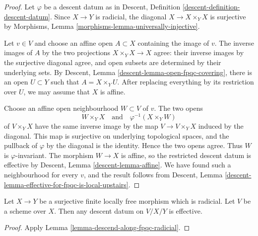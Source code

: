 \begin{proof}
Let $\varphi$ be a descent datum as in
Descent, Definition \ref{descent-definition-descent-datum}.
Since $X \to Y$ is radicial, the diagonal
$X \to X \times_Y X$ is surjective by
Morphisms, Lemma \ref{morphisms-lemma-universally-injective}.

Let $v \in V$ and choose an affine open $A \subset X$ containing the
image of $v$. The inverse images of $A$ by the two projections
$X \times_Y X \to X$ agree: their inverse images by the surjective
diagonal agree, and open subsets are determined by their underlying sets.
By Descent, Lemma \ref{descent-lemma-open-fpqc-covering}, there is an open
$U \subset Y$ such that $A = X \times_Y U$. After replacing everything by
its restriction over $U$, we may assume that $X$ is affine.

Choose an affine open neighbourhood $W \subset V$ of $v$. The two opens
$$
W \times_Y X
\quad\text{and}\quad
\varphi^{-1}(X \times_Y W)
$$
of $V \times_Y X$ have the same inverse image by the map
$V \to V \times_Y X$ induced by the diagonal. This map is surjective on
underlying topological spaces, and the pullback of $\varphi$ by the diagonal
is the identity. Hence the two opens agree. Thus $W$ is
$\varphi$-invariant. The morphism $W \to X$ is affine, so the restricted
descent datum is effective by
Descent, Lemma \ref{descent-lemma-affine}. We have found such a neighbourhood
for every $v$, and the result follows from
Descent, Lemma \ref{descent-lemma-effective-for-fpqc-is-local-upstairs}.
\end{proof}

\begin{lemma}
\label{lemma-descend-along-finite-radicial}
Let $X \to Y$ be a surjective finite locally free morphism which is radicial. 
Let $V$ be a scheme over $X$. Then any descent datum on $V/X/Y$ is effective.
\end{lemma}

\begin{proof}
Apply Lemma \ref{lemma-descend-along-fpqc-radicial}.
\end{proof}














